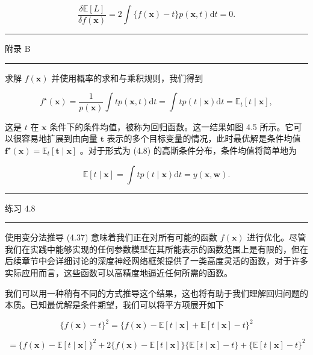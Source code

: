 \documentclass[10pt]{article}
\newcommand{\HRule}{\begin{center}\rule{0.9\linewidth}{0.2mm}\end{center}}
\begin{document}
\[
\frac{\delta \mathbb{E}\left\lbrack  L\right\rbrack  }{{\delta f}\left( \mathbf{x}\right) } = 2\int \{ f\left( \mathbf{x}\right)  - t\} p\left( {\mathbf{x},t}\right) \mathrm{d}t = 0. \tag{4.36}
\]

\HRule

附录 B

\HRule

求解 \(f\left( \mathbf{x}\right)\) 并使用概率的求和与乘积规则，我们得到

\[
{f}^{ \star  }\left( \mathbf{x}\right)  = \frac{1}{p\left( \mathbf{x}\right) }\int {tp}\left( {\mathbf{x},t}\right) \mathrm{d}t = \int {tp}\left( {t \mid  \mathbf{x}}\right) \mathrm{d}t = {\mathbb{E}}_{t}\left\lbrack  {t \mid  \mathbf{x}}\right\rbrack  , \tag{4.37}
\]

这是 \(t\) 在 \(\mathbf{x}\) 条件下的条件均值，被称为回归函数。这一结果如图 4.5 所示。它可以很容易地扩展到由向量 \(\mathbf{t}\) 表示的多个目标变量的情况，此时最优解是条件均值 \({\mathbf{f}}^{ \star  }\left( \mathbf{x}\right)  = {\mathbb{E}}_{t}\left\lbrack  {\mathbf{t} \mid  \mathbf{x}}\right\rbrack\) 。对于形式为 (4.8) 的高斯条件分布，条件均值将简单地为

\[
\mathbb{E}\left\lbrack  {t \mid  \mathbf{x}}\right\rbrack   = \int {tp}\left( {t \mid  \mathbf{x}}\right) \mathrm{d}t = y\left( {\mathbf{x},\mathbf{w}}\right) . \tag{4.38}
\]

\HRule

练习 4.8

\HRule

使用变分法推导 (4.37) 意味着我们正在对所有可能的函数 \(f\left( \mathbf{x}\right)\) 进行优化。尽管我们在实践中能够实现的任何参数模型在其所能表示的函数范围上是有限的，但在后续章节中会详细讨论的深度神经网络框架提供了一类高度灵活的函数，对于许多实际应用而言，这些函数可以高精度地逼近任何所需的函数。

我们可以用一种稍有不同的方式推导这个结果，这也将有助于我们理解回归问题的本质。已知最优解是条件期望，我们可以将平方项展开如下

\[
\{ f\left( \mathbf{x}\right)  - t{\} }^{2} = \{ f\left( \mathbf{x}\right)  - \mathbb{E}\left\lbrack  {t \mid  \mathbf{x}}\right\rbrack   + \mathbb{E}\left\lbrack  {t \mid  \mathbf{x}}\right\rbrack   - t{\} }^{2}
\]

\[
= \{ f\left( \mathbf{x}\right)  - \mathbb{E}\left\lbrack  {t \mid  \mathbf{x}}\right\rbrack  {\} }^{2} + 2\{ f\left( \mathbf{x}\right)  - \mathbb{E}\left\lbrack  {t \mid  \mathbf{x}}\right\rbrack  \} \{ \mathbb{E}\left\lbrack  {t \mid  \mathbf{x}}\right\rbrack   - t\}  + \{ \mathbb{E}\left\lbrack  {t \mid  \mathbf{x}}\right\rbrack   - t{\} }^{2}
\]
\end{document}
